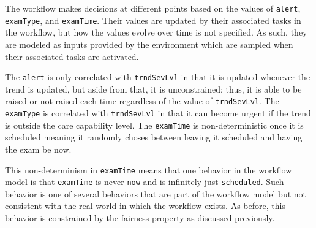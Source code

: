 The workflow makes decisions at different points based on the values of \texttt{alert}, \texttt{examType}, and \texttt{examTime}. Their values are updated by their associated tasks in the workflow, but how the values evolve over time is not specified. As such, they are modeled as inputs provided by the environment which are sampled when their associated tasks are activated.

The \texttt{alert} is only correlated with \texttt{trndSevLvl} in that it is updated whenever the trend is updated, but aside from that, it is unconstrained; thus, it is able to be raised or not raised each time regardless of the value of \texttt{trndSevLvl}. The \texttt{examType} is correlated with \texttt{trndSevLvl} in that it can become urgent if the trend is outside the care capability level. The \texttt{examTime} is non-deterministic once it is scheduled meaning it randomly choses between leaving it scheduled and having the exam be now.

This non-determinism in \texttt{examTime} means that one behavior in the workflow model is that \texttt{examTime} is never \texttt{now} and is infinitely just \texttt{scheduled}. Such behavior is one of several behaviors that are part of the workflow model but not consistent with the real world in which the workflow exists. As before, this behavior is constrained by the fairness property as discussed previously.

